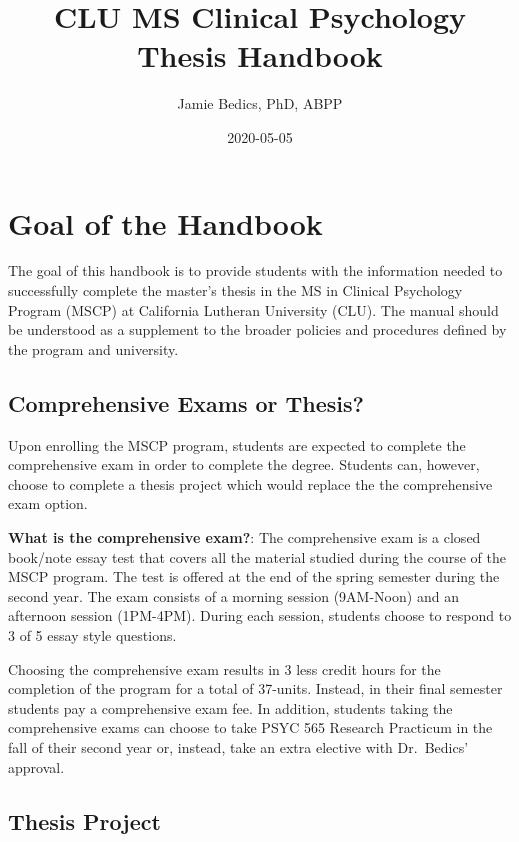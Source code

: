 \documentclass[]{book}
\title{CLU MS Clinical Psychology Thesis Handbook}
\author{Jamie Bedics, PhD, ABPP}
\date{2020-05-05}
\begin{document}
\maketitle

{
\setcounter{tocdepth}{1}
\tableofcontents
}
\hypertarget{goal-of-the-handbook}{%
\chapter{Goal of the Handbook}\label{goal-of-the-handbook}}

The goal of this handbook is to provide students with the information needed to successfully complete the master's thesis in the MS in Clinical Psychology Program (MSCP) at California Lutheran University (CLU). The manual should be understood as a supplement to the broader policies and procedures defined by the program and university.

\hypertarget{comprehensive-exams-or-thesis}{%
\section{Comprehensive Exams or Thesis?}\label{comprehensive-exams-or-thesis}}

Upon enrolling the MSCP program, students are expected to complete the comprehensive exam in order to complete the degree. Students can, however, choose to complete a thesis project which would replace the the comprehensive exam option.

\textbf{What is the comprehensive exam?}: The comprehensive exam is a closed book/note essay test that covers all the material studied during the course of the MSCP program. The test is offered at the end of the spring semester during the second year. The exam consists of a morning session (9AM-Noon) and an afternoon session (1PM-4PM). During each session, students choose to respond to 3 of 5 essay style questions.

Choosing the comprehensive exam results in 3 less credit hours for the completion of the program for a total of 37-units. Instead, in their final semester students pay a comprehensive exam fee. In addition, students taking the comprehensive exams can choose to take PSYC 565 Research Practicum in the fall of their second year or, instead, take an extra elective with Dr.~Bedics' approval.

\hypertarget{thesis-project}{%
\section{Thesis Project}\label{thesis-project}}
\end{document}
